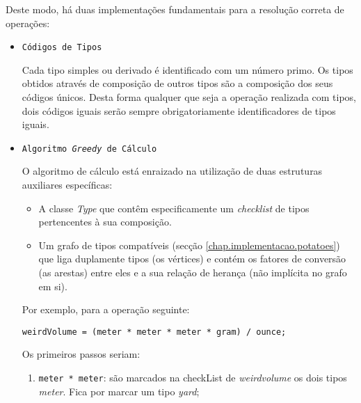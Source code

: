 \documentclass{report}
\begin{document}
Deste modo, há duas implementações fundamentais para a resolução correta de operações:

\begin{itemize}
\item \texttt{Códigos de Tipos}

Cada tipo simples ou derivado é identificado com um número primo. Os tipos obtidos através de composição de outros tipos são a composição dos seus códigos únicos. Desta forma qualquer que seja a operação realizada com tipos, dois códigos iguais serão sempre obrigatoriamente identificadores de tipos iguais.
\pagebreak
\item \texttt{Algoritmo \textit{Greedy} de Cálculo}

O algoritmo de cálculo está enraizado na utilização de duas estruturas auxiliares específicas:
\begin{itemize}
    \item A classe \textit{Type} que contêm especificamente um \textit{checklist} de tipos pertencentes à sua composição. 
    \item Um grafo de tipos compatíveis (secção \ref{chap.implementacao.potatoes}) que liga duplamente tipos (os vértices) e contém os fatores de conversão (as arestas) entre eles e a sua relação de herança (não implícita no grafo em si).
\end{itemize}
Por exemplo, para a operação seguinte:
\begin{lstlisting}
weirdVolume = (meter * meter * meter * gram) / ounce;
\end{lstlisting}

Os primeiros passos seriam:
\begin{enumerate}
    \item \texttt{meter * meter}: são marcados na checkList de \textit{weirdvolume} os dois tipos \textit{meter}. Fica por marcar um tipo \textit{yard};
    

\end{enumerate}
\end{itemize}
\end{document}
